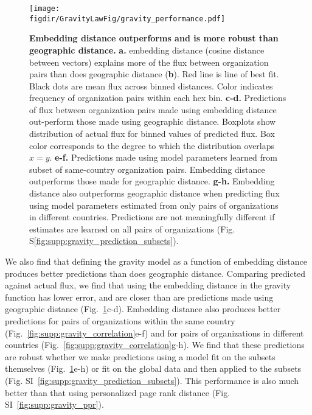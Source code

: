 \documentclass[12pt]{article} %
\def\figdir{../Figs}
\begin{document}
%
%
\begin{figure}[h!]
	\centering
	\label{fig:gravity_performance}
	\texttt{[image: \\figdir/GravityLawFig/gravity\_performance.pdf]}
	\caption{
		\textbf{Embedding distance outperforms and is more robust than geographic distance.}
		\textbf{a.} embedding distance (cosine distance between vectors) explains more of the flux between organization pairs than does geographic distance (\textbf{b}). 
		Red line is line of best fit. 
		Black dots are mean flux across binned distances.
		Color indicates frequency of organization pairs within each hex bin.
		\textbf{c-d.} Predictions  of flux between organization pairs made using embedding distance out-perform those made using geographic distance. 
		Boxplots show distribution of actual flux for binned values of predicted flux.
		Box color corresponds to the degree to which the distribution overlaps $x = y$.
		\textbf{e-f.} Predictions made using model parameters learned from subset of same-country organization pairs. 
		Embedding distance outperforms those made for geographic distance.
		\textbf{g-h.} Embedding distance also outperforms geographic distance when predicting flux using model parameters estimated from only pairs of organizations in different countries. 
		Predictions are not meaningfully different if estimates are learned on all pairs of organizations (Fig. S\ref{fig:supp:gravity_prediction_subsets}).
	}
\end{figure}

We also find that defining the gravity model as a function of embedding distance produces better predictions than does geographic distance.
Comparing predicted against actual flux, we find that using the embedding distance in the gravity function has lower error, and are closer than are predictions made using geographic distance (Fig.~\ref{fig:gravity_performance}c-d). 
Embedding distance also produces better predictions for pairs of organizations within the same country (Fig.~\ref{fig:supp:gravity_correlation}e-f) and for pairs of organizations in different countries (Fig.~\ref{fig:supp:gravity_correlation}g-h). 
We find that these predictions are robust whether we make predictions using a model fit on the subsets themselves (Fig.~\ref{fig:gravity_performance}e-h) or fit on the global data and then applied to the subsets (Fig. SI~\ref{fig:supp:gravity_prediction_subsets}). 
This performance is also much better than that using personalized page rank distance (Fig. SI~\ref{fig:supp:gravity_ppr}). 
\end{document}
